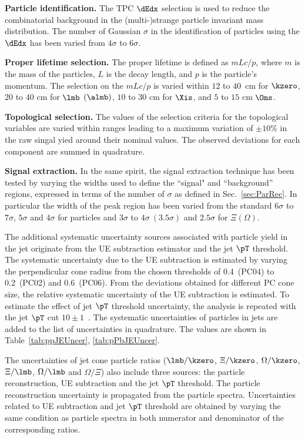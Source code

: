 \documentclass[ALICE,manyauthors]{cernphprep}
\begin{document}
\textbf{Particle identification.} The TPC $\dEdx$ selection is used to reduce the combinatorial background in the (multi-)strange particle invariant mass distribution.
The number of Gaussian $\sigma$ in the identification of particles using the $\dEdx$ has been varied from $4\sigma$ to $6\sigma$.

\textbf{Proper lifetime selection.} The proper lifetime is defined as $mLc/p$, where $m$ is the mass of the particles, $L$ is the decay length, and $p$ is the particle's momentum.
The selection on the $mLc/p$ is varied within $12$ to $40$~cm for $\kzero$, $20$ to $40$ cm for $\lmb$ $(\almb)$, $10$ to $30$ cm for $\Xis$, and $5$ to $15$ cm $\Oms$.

\textbf{Topological selection.} The values of the selection criteria for the topological variables are varied within ranges leading to a maximum variation of $\pm 10\%$ in the raw singal yied around their nominal values.
The observed deviations for each component are summed in quadrature.

\textbf{Signal extraction.} In the same spirit, the signal extraction technique has been tested by varying the widths used to define the ``signal" and ``background'' regions, expressed in terms of the number of $\sigma$ as defined in Sec.~\ref{sec:ParRec}.
In particular the width of the peak region has been varied from the standard $6\sigma$ to $7\sigma$, $5\sigma$ and $4\sigma$ for \Vzero particles and  $3\sigma$ to $4\sigma~(3.5\sigma)$ and $2.5\sigma$ for $\Xi(\Omega)$.

The additional systematic uncertainty sources associated with particle yield in the jet originate from the UE subtraction estimator and the jet $\pT$ threshold.
The systematic uncertainty due to the UE subtraction is estimated by varying the perpendicular cone radius from the chosen thresholds of 0.4~(PC04) to 0.2~(PC02) and 0.6~(PC06).
From the deviations obtained for different PC cone size, the relative systematic uncertainty of the UE subtraction is estimated.
To estimate the effect of jet $\pT$ threshold uncertainty, the analysis is repeated with the jet $\pT$ cut $10\pm 1$~\GeVc.
The systematic uncertainties of particles in jets are added to the list of uncertainties in quadrature.
The values are shown in Table~\ref{tab:ppJEUncer}, \ref{tab:pPbJEUncer}.

The uncertainties of jet cone particle ratios ($\lmb/\kzero$, $\Xi/\kzero$, $\Omega/\kzero$, $\Xi/\lmb$, $\Omega/\lmb$ and $\Omega/\Xi$) also include three sources: the particle reconstruction, UE subtraction and the jet $\pT$ threshold.
The particle reconstruction uncertainty is propagated from the particle spectra.
Uncertainties related to UE subtraction and jet $\pT$ threshold are obtained by varying the same condition as particle spectra in both numerator and denominator of the corresponding ratios.
\end{document}
